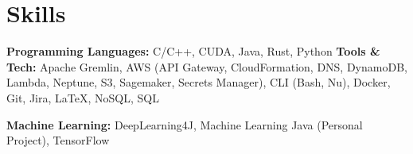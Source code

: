 ﻿
\section{Skills}

\textbf{Programming Languages: } C/C++, CUDA, Java, Rust, Python
\bigbreak
\textbf{Tools \& Tech: } Apache Gremlin, AWS (API Gateway, CloudFormation, DNS, DynamoDB, Lambda, Neptune, S3, Sagemaker, Secrets Manager), CLI (Bash, Nu), Docker, Git, Jira, \LaTeX, NoSQL, SQL

\bigbreak
\textbf{Machine Learning: } DeepLearning4J, Machine Learning Java (Personal Project), TensorFlow
